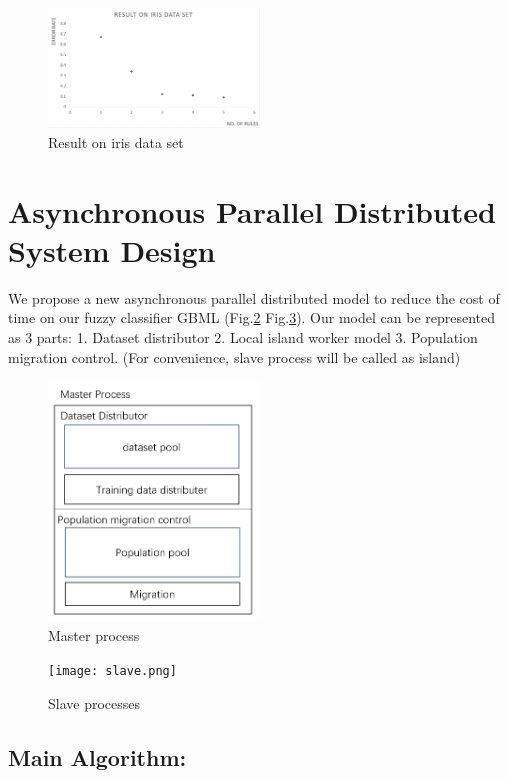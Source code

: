 \documentclass[conference]{IEEEtran}
\begin{document}
 \begin{figure}[H]
 	\centering
 	\includegraphics[width=0.5\textwidth]{iris.png}
 	\caption{Result on iris data set}\label{fig:digit1}
 \end{figure}
  \section{Asynchronous Parallel Distributed System Design}
We propose a new asynchronous parallel distributed model to reduce the cost of time on our fuzzy classifier GBML (Fig.\ref{fig:digit2} Fig.\ref{fig:digit3}). Our model can be represented as 3 parts: 1. Dataset distributor 2. Local island worker model 3. Population migration control. (For convenience, slave process will be called as island)

 \begin{figure}[H]
	\centering
	\includegraphics[width=0.5\textwidth]{master.png}
	\caption{Master process}\label{fig:digit2}
\end{figure}
\begin{figure}[H]
	\centering
	\texttt{[image: slave.png]}
	\caption{Slave processes}\label{fig:digit3}
\end{figure}

	\subsection{Main Algorithm:}
\end{document}
